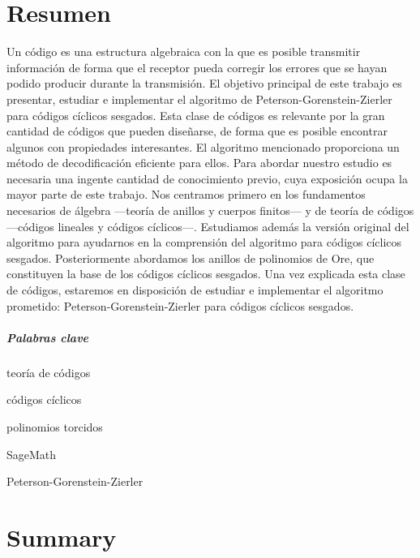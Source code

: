 \chapter*{Resumen}

Un código es una estructura algebraica con la que es posible transmitir información de forma que el receptor pueda corregir los errores que se hayan podido producir durante la transmisión.
El objetivo principal de este trabajo es presentar, estudiar e implementar el algoritmo de Peterson-Gorenstein-Zierler para códigos cíclicos sesgados.
Esta clase de códigos es relevante por la gran cantidad de códigos que pueden diseñarse, de forma que es posible encontrar algunos con propiedades interesantes.
El algoritmo mencionado proporciona un método de decodificación eficiente para ellos.
Para abordar nuestro estudio es necesaria una ingente cantidad de conocimiento previo, cuya exposición ocupa la mayor parte de este trabajo.
Nos centramos primero en los fundamentos necesarios de álgebra —teoría de anillos y cuerpos finitos— y de teoría de códigos —códigos lineales y códigos cíclicos—.
Estudiamos además la versión original del algoritmo  para ayudarnos en la comprensión del algoritmo para códigos cíclicos sesgados.
Posteriormente abordamos los anillos de polinomios de Ore, que constituyen la base de los códigos cíclicos sesgados.
Una vez explicada esta clase de códigos, estaremos en disposición de estudiar e implementar el algoritmo prometido: Peterson-Gorenstein-Zierler para códigos cíclicos sesgados.

\paragraph{Palabras clave}
\begin{itemize*}[label=,itemsep=4em,itemjoin=\hspace{2em}]
  \item teoría de códigos
  \item códigos cíclicos
  \item polinomios torcidos
  \item SageMath
  \item Peterson-Gorenstein-Zierler
\end{itemize*}

\chapter*{Summary}

